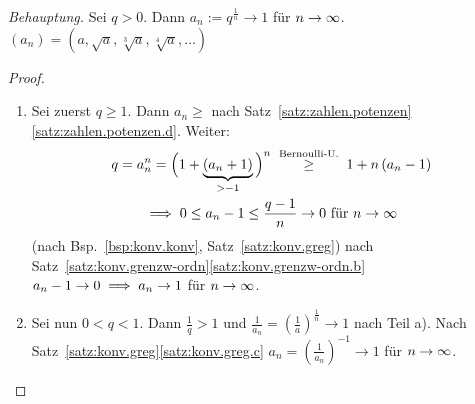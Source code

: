 \documentclass[12pt]{scrreprt}
\begin{document}
\begin{bsp}
  \label{bsp:konv.kte-wurzel}
  \emph{Behauptung.}  Sei $q>0$. Dann $a_n := q^{\frac{1}{n}}\to1$ für
  $n\rightarrow\infty$.\\$(a_n)=(a, \sqrt{a}, \sqrt[3]{a}, \sqrt[4]{a}, \dotsc)$
  \begin{proof}
    \begin{enumerate}
    \item Sei zuerst $q\ge1$. Dann $a_n\ge$ nach
      Satz~\ref{satz:zahlen.potenzen}\ref{satz:zahlen.potenzen.d}. Weiter:
      \begin{gather*}
        q=a_n^n=\Big(1+\underbrace{\left(a_n+1\right)}_{>-1}\Big)^n
        \nach{\ge}{Bernoulli-U.} 1+n\left(a_n-1\right)\\
        \folgt 0\le a_n-1 \le \frac{q-1}{n} \to 0\text{ für }\ninf
      \end{gather*}
      (nach Bsp.~\ref{bsp:konv.konv}, Satz~\ref{satz:konv.greg})
      \folgt nach
      Satz~\ref{satz:konv.grenzw-ordn}\ref{satz:konv.grenzw-ordn.b}
      $a_n-1\to0 \implies a_n\to1$ für $n\rightarrow\infty$.\\
    \item Sei nun $0<q<1$. Dann $\frac1q>1$ und
      $\frac{1}{a_n}=\left(\frac1a\right)^\frac1n\to1$ nach Teil
      a). Nach Satz~\ref{satz:konv.greg}\ref{satz:konv.greg.c} \folgt
      $a_n=\left(\frac{1}{a_n}\right)^{-1}\to1$ für $n\rightarrow\infty$.
    \end{enumerate}
  \end{proof}
\end{bsp}
\end{document}
